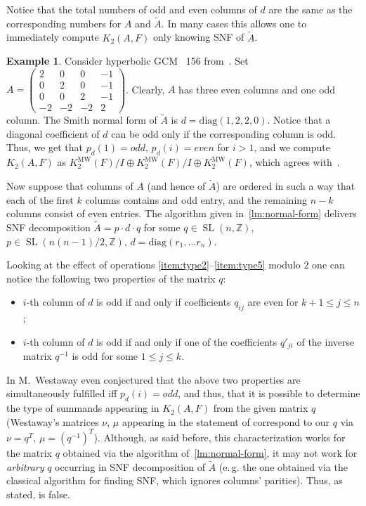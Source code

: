 \documentclass[oneside, 10pt]{amsart}
\theoremstyle{plain}
\theoremstyle{remark}
\theoremstyle{definition}
\newtheorem{example}{Example} \Crefname{example}{Example}{Examples}
\DeclareMathOperator{\SL}{SL}
\newcommand{\ZZ}{\mathbb{Z}}
\newcommand{\K}{K_2}
\newcommand{\Kmw}{K^{\mathrm{MW}}_2}
\begin{document}
Notice that the total numbers of odd and even columns of $d$ are the same as the corresponding numbers for $A$ and $\widetilde{A}$.
In many cases this allows one to immediately compute $\K(A, F)$ only knowing SNF of $\widetilde{A}$.
\begin{example}
Consider hyperbolic GCM \textnumero~156 from~\cite[p.~19]{MW}.
 Set $A = \left(\begin{smallmatrix}
 2& 0& 0& -1\\
 0& 2& 0& -1\\
 0& 0& 2& -1\\
 -2& -2& -2& 2\end{smallmatrix}\right)$.
Clearly, $A$ has three even columns and one odd column. 
The Smith normal form of $\widetilde{A}$ is $d=\mathrm{diag}(1,2,2,0)$.
Notice that a diagonal coefficient of $d$ can be odd only if the corresponding column is odd.
Thus, we get that $p_d(1)=odd$, $p_d(i)=even$ for $i>1$, and we compute $\K(A, F)$ as $\Kmw(F)/I \oplus \Kmw(F)/I \oplus \Kmw(F)$,
 which agrees with~\cite{MW}.
\end{example}
  
Now suppose that columns of $A$ (and hence of $\widetilde{A}$) are ordered in such a way that
 each of the first $k$ columns contains and odd entry, and the remaining $n-k$ columns consist of even entries.
The algorithm given in~\cref{lm:normal-form} delivers SNF decomposition
 $\widetilde{A} = p \cdot d \cdot q $ for some $q \in \SL(n, \ZZ)$, $p \in \SL(n(n-1)/2, \ZZ)$, $d = \mathrm{diag}(r_1, \ldots r_n)$.

Looking at the effect of operations \eqref{item:type2}--\eqref{item:type5} modulo $2$ one can notice the following two properties of the matrix $q$:
\begin{itemize}
 \item $i$-th column of $d$ is odd if and only if coefficients $q_{ij}$ are even for $k+1\leq j \leq n$;
 \item $i$-th column of $d$ is odd if and only if one of the coefficients $q'_{ji}$ of the inverse matrix $q^{-1}$ is odd for some $1\leq j\leq k$.
\end{itemize}

In \cite{MW} M.~Westaway even conjectured that the above two properties are simultaneously fulfilled iff $p_d(i)=odd$, and thus, that
 it is possible to determine the type of summands appearing in $\K(A, F)$ from the given matrix $q$
 (Westaway's matrices $\nu$, $\mu$ appearing in the statement of \cite[Conjecture~9.1]{MW} correspond to our $q$ via $\nu = q^T$, $\mu = (q^{-1})^T$).
Although, as said before, this characterization works for the matrix $q$ obtained via the algorithm of~\cref{lm:normal-form},
 it may not work for {\it arbitrary} $q$ occurring in SNF decomposition of $\widetilde{A}$
 (e.\,g. the one obtained via the classical algorithm for finding SNF, which ignores columns' parities).
Thus, as stated, \cite[Conjecture~9.1]{MW} is false.
\end{document}

